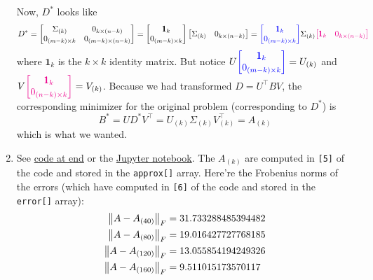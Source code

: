 \begin{enumerate}[leftmargin=*]
Now, $D^*$ looks like $$ D^{*}=\begin{bmatrix}
\Sigma_{(k)} & 0_{k\times(n-k)}\\0_{(m-k)\times k}&0_{(m-k)\times(n-k)}
\end{bmatrix}=
\begin{bmatrix}
\pmb 1_{k} \\0_{(m-k)\times k}
\end{bmatrix}
\begin{bmatrix}
\Sigma_{(k)} & 0_{k\times(n-k)}
\end{bmatrix}
={\color{blue}\begin{bmatrix}
\pmb 1_{k} \\0_{(m-k)\times k}
\end{bmatrix}}
\Sigma_{(k)}
{\color{magenta}\begin{bmatrix}
\pmb 1_{k} & 0_{k\times(n-k)}
\end{bmatrix}}
$$ where $\pmb 1_k$ is the $k\times k$ identity matrix. But notice $U{\color{blue}\begin{bmatrix}
\pmb 1_{k} \\0_{(m-k)\times k}
\end{bmatrix}} = U_{(k)}$ and $V{\color{magenta}\begin{bmatrix}
\pmb 1_{k} \\ 0_{(n-k)\times k}
\end{bmatrix}} = V_{(k)}$.
Because we had transformed $D=U^{\top} B V$, the corresponding minimizer for the original problem (corresponding to $D^*$) is $$B^*=UD^*V^\top = U_{(k)}\Sigma_{(k)}V_{(k)}^\top = A_{(k)}$$ which is what we wanted.

\item See \hyperref[pdf:imgcom]{code at end} or the \href{https://github.com/nilavam/nilavam.github.io/blob/5552db4aab806c636c3de2188940259679bd212a/ConOpt/HW1/image%20compression.ipynb}{Jupyter notebook}. 
The $A_{{(k)}}$ are computed in \texttt{[5]} of the code and stored in the \texttt{approx[]} array.
Here're the Frobenius norms of the errors (which have computed in \texttt{[6]} of the code and stored in the \texttt{error[]} array):
\begin{align*}
\left\lVert A-A_{(40)} \right\rVert_{F} &= 31.733288485394482\\
\left\lVert A-A_{(80)} \right\rVert_{F} &= 19.016427727768185\\
\left\lVert A-A_{(120)} \right\rVert_{F} &= 13.055854194249326\\
\left\lVert A-A_{(160)} \right\rVert_{F} &= 9.511015173570117
\end{align*}


\end{enumerate}
